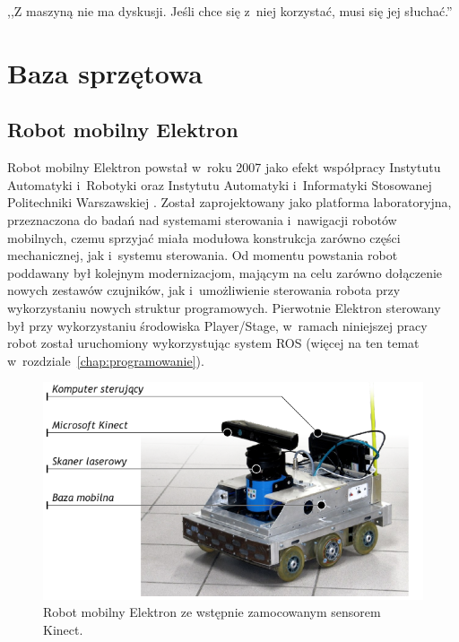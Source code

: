 

\begin{savequote}[70mm]
,,Z maszyną nie ma dyskusji. Jeśli chce się z~niej korzystać, musi się jej słuchać.''
\end{savequote}


\chapter{Baza sprzętowa}
\label{chap:sprzet}


\section{Robot mobilny Elektron}

Robot mobilny Elektron powstał w~roku 2007 jako efekt współpracy Instytutu Automatyki
i~Robotyki oraz Instytutu Automatyki i~Informatyki Stosowanej Politechniki Warszawskiej
\cite{SzynkiewiczEtal06}. Został zaprojektowany jako platforma laboratoryjna,
przeznaczona do badań nad systemami sterowania i~nawigacji robotów mobilnych,
czemu sprzyjać miała modułowa konstrukcja zarówno części mechanicznej, jak i~systemu
sterowania. Od momentu powstania robot poddawany był kolejnym modernizacjom,
mającym na celu zarówno dołączenie nowych zestawów czujników, jak i~umożliwienie
sterowania robota przy wykorzystaniu nowych struktur programowych. Pierwotnie Elektron
sterowany był przy wykorzystaniu środowiska Player/Stage, w~ramach niniejszej pracy
robot został uruchomiony wykorzystując system ROS (więcej na ten temat
w~rozdziale~\ref{chap:programowanie}).


\begin{figure}[h!]
\centering
\includegraphics{../../Common/img/elektron/elektron_desc}
\caption[Robot mobilny Elektron]{Robot mobilny Elektron ze wstępnie zamocowanym
sensorem Kinect.}
\label{fig:elektron}
\end{figure}

